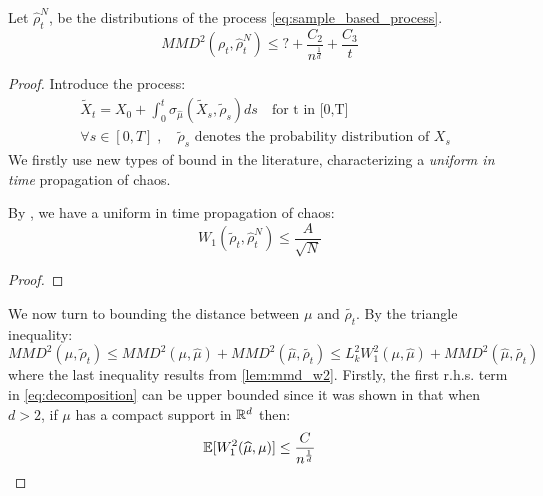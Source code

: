 \begin{proposition} Let $\widehat{\rho}_t^N$, be the distributions of the process \eqref{eq:sample_based_process}.
	\begin{equation}
	MMD^2(\rho_t,\widehat{\rho}_t^N)\le ?+ \frac{C_2}{n^{\frac{1}{d}}} + \frac{C_3}{t}
	\end{equation}
\end{proposition}
\begin{proof} 
	Introduce the process:
	\begin{align}\label{eq:intermediary_process}
	&\widetilde{X}_t=X_{0}+\int_{0}^t \sigma_{\widehat{\mu}}(\widetilde{X}_s, \widetilde{\rho}_s)ds \quad \text{for t in [0,T]}\\
	&\forall s \in [0,T]\;,\quad \widetilde{\rho}_s \text{ denotes the probability distribution of } X_s
	\end{align}
	We firstly use new types of bound in the literature, characterizing a \textit{uniform in time} propagation of chaos.
	\begin{lemma}
		By \cite{durmus2018elementary}, we have a uniform in time propagation of chaos:
		\begin{equation}
		W_1(\widetilde{\rho}_t,\widehat{\rho}_t^N)\le \frac{A}{\sqrt{N}}
		\end{equation}
	\end{lemma}
\begin{proof}
\end{proof}
	We now turn to bounding the distance between $\mu$ and $\widetilde{\rho_t}$. By the triangle inequality:
	\begin{equation}\label{eq:decomposition}
	MMD^2(\mu, \widetilde{\rho}_t)\le MMD^2(\mu, \widehat{\mu})+MMD^2(\widehat{\mu}, \widetilde{\rho_t})\le L_k^2 W_1^2(\mu, \widehat{\mu})+MMD^2(\widehat{\mu}, \widetilde{\rho_t})
	\end{equation}
	where the last inequality results from \cref{lem:mmd_w2}. Firstly, the first r.h.s. term in \eqref{eq:decomposition} can be upper bounded since it was shown in \cite{dudley1969speed} that when $d > 2$, if $\mu$ has a compact support in ${{\mathbb R}}^d$ then:
	\begin{equation}
	{{\mathbb E}}[W_1^2(\widehat{\mu},\mu)]\le \frac{C}{n^{\frac{1}{d}}}
	\end{equation}

\end{proof}
